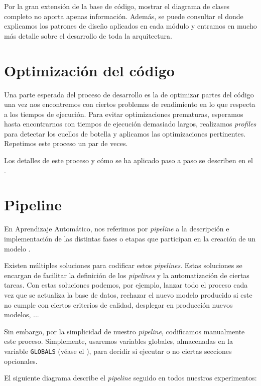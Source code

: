 Por la gran extensión de la base de código, mostrar el diagrama de clases completo no aporta apenas información. Además, se puede consultar el  donde explicamos los patrones de diseño aplicados en cada módulo y entramos en mucho más detalle sobre el desarrollo de toda la arquitectura.

\section{Optimización del código}

Una parte esperada del proceso de desarrollo es la de optimizar partes del código una vez nos encontremos con ciertos problemas de rendimiento en lo que respecta a los tiempos de ejecución. Para evitar optimizaciones prematuras, esperamos hasta encontrarnos con tiempos de ejecución demasiado largos, realizamos \textit{profiles} para detectar los cuellos de botella y aplicamos las optimizaciones pertinentes. Repetimos este proceso un par de veces.

Los detalles de este proceso y cómo se ha aplicado paso a paso se describen en el .

\section{Pipeline} \label{isec:pipeline}

En Aprendizaje Automático, nos referimos por \textit{pipeline} a la descripción e implementación de las distintas fases o etapas que participan en la creación de un modelo \cite{informatica:pipeline_web}.

Existen múltiples soluciones para codificar estos \textit{pipelines}. Estas soluciones se encargan de facilitar la definición de los \textit{pipelines} y la automatización de ciertas tareas. Con estas soluciones podemos, por ejemplo, lanzar todo el proceso cada vez que se actualiza la base de datos, rechazar el nuevo modelo producido si este no cumple con ciertos criterios de calidad, desplegar en producción nuevos modelos, ...

Sin embargo, por la simplicidad de nuestro \textit{pipeline}, codificamos manualmente este proceso. Simplemente, usaremos variables globales, almacenadas en la variable \lstinline{GLOBALS} (véase el ), para decidir si ejecutar o no ciertas secciones opcionales.

El siguiente diagrama describe el \textit{pipeline} seguido en todos nuestros experimentos:

